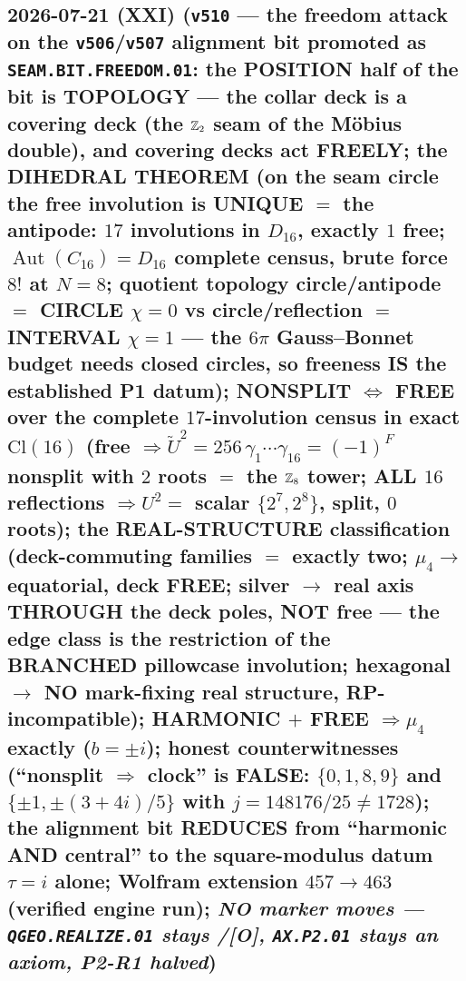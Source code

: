 \documentclass[11pt]{article}
\providecommand{\mO}{\textbf{[O]}}\providecommand{\mX}{\textbf{[X]}}
\providecommand{\Aut}{\operatorname{Aut}}
\begin{document}
\subsection*{2026-07-21 (XXI) (\texttt{v510} --- the freedom attack on the \texttt{v506}/\texttt{v507} alignment bit promoted as \texttt{SEAM.BIT.FREEDOM.01}: the POSITION half of the bit is TOPOLOGY --- the collar deck is a covering deck (the $\mathbb{Z}_2$ seam of the M\"obius double), and covering decks act FREELY; the DIHEDRAL THEOREM (on the seam circle the free involution is UNIQUE $=$ the antipode: $17$ involutions in $D_{16}$, exactly $1$ free; $\Aut(C_{16})=D_{16}$ complete census, brute force $8!$ at $N{=}8$; quotient topology circle/antipode $=$ CIRCLE $\chi{=}0$ vs circle/reflection $=$ INTERVAL $\chi{=}1$ --- the $6\pi$ Gauss--Bonnet budget needs closed circles, so freeness IS the established P1 datum); NONSPLIT $\iff$ FREE over the complete $17$-involution census in exact $\mathrm{Cl}(16)$ (free $\Rightarrow\tilde U^2=256\,\gamma_1\cdots\gamma_{16}=(-1)^F$ nonsplit with $2$ roots $=$ the $\mathbb{Z}_8$ tower; ALL $16$ reflections $\Rightarrow U^2=$ scalar $\{2^7,2^8\}$, split, $0$ roots); the REAL-STRUCTURE classification (deck-commuting families $=$ exactly two; $\mu_4\to$ equatorial, deck FREE; silver $\to$ real axis THROUGH the deck poles, NOT free --- the edge class is the restriction of the BRANCHED pillowcase involution; hexagonal $\to$ NO mark-fixing real structure, RP-incompatible); HARMONIC $+$ FREE $\Rightarrow\mu_4$ exactly ($b=\pm i$); honest counterwitnesses (``nonsplit $\Rightarrow$ clock'' is FALSE: $\{0,1,8,9\}$ and $\{\pm1,\pm(3{+}4i)/5\}$ with $j=148176/25\neq1728$); the alignment bit REDUCES from ``harmonic AND central'' to the square-modulus datum $\tau=i$ alone; Wolfram extension $457\to463$ (verified engine run); \emph{NO marker moves --- \texttt{QGEO.REALIZE.01} stays \mC/\mO, \texttt{AX.P2.01} stays an axiom, P2-R1 halved})}
\end{document}
